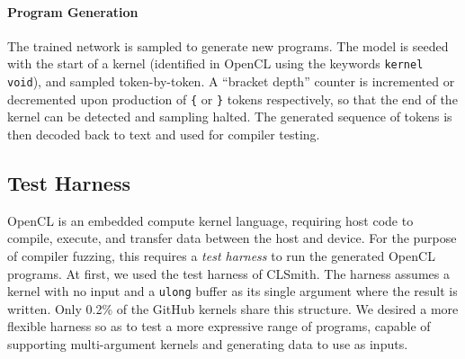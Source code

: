 
\paragraph{Program Generation} The trained network is sampled to generate new programs. The model is seeded with the start of a kernel (identified in OpenCL using the keywords \texttt{kernel void}), and sampled token-by-token. A ``bracket depth'' counter is incremented or decremented upon production of \texttt{\{} or \texttt{\}} tokens respectively, so that the end of the kernel can be detected and sampling halted. The generated sequence of tokens is then decoded back to text and used for compiler testing.


\subsection{Test Harness\label{sec:test-harness}}

OpenCL is an embedded compute kernel language, requiring host code to compile, execute, and transfer data between the host and device. For the purpose of compiler fuzzing, this requires a \emph{test harness} to run the generated OpenCL programs. At first, we used the test harness of CLSmith. The harness assumes a kernel with no input and a \texttt{ulong} buffer as its single argument where the result is written. Only 0.2\% of the GitHub kernels share this structure. We desired a more flexible harness so as to test a more expressive range of programs, capable of supporting multi-argument kernels and generating data to use as inputs.

